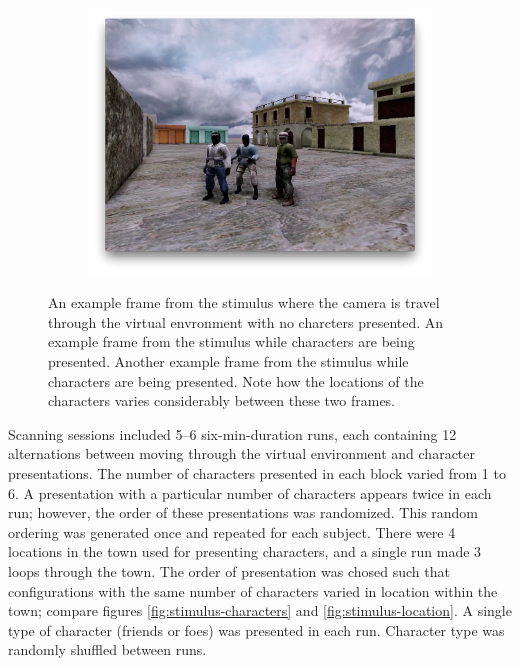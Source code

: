 \documentclass[preprint,5p,authoryear]{elsarticle}
\begin{document}
\begin{figure}
\begin{subfigure}{0.4\textwidth}
\includegraphics[width=\textwidth]{figures/stimulus-three-insurgents}
\caption{}
\label{fig:stimulus-three-insurgents}
\end{subfigure}
\caption{
 An example frame from the stimulus where the camera is travel through the virtual envronment with no charcters presented.
 An example frame from the stimulus while characters are being presented.
 Another example frame from the stimulus while characters are being presented.
Note how the locations of the characters varies considerably between these two frames.}
\label{fig:stimulus}
\end{figure}

Scanning sessions included 5--6 six-min-duration runs,
each containing 12 alternations between moving through the virtual environment and character presentations. 
The number of characters presented in each block varied from 1 to 6.
A presentation with a particular number of characters appears twice in each run; however, the order of these presentations was randomized.
This random ordering was generated once and repeated for each subject.
There were 4 locations in the town used for presenting characters, and a single run made 3 loops through the town.
The order of presentation was chosed such that configurations with the same number of characters varied in location within the town; compare figures \ref{fig:stimulus-characters} and \ref{fig:stimulus-location}.
A single type of character (friends or foes) was presented in each run. Character type was randomly shuffled between runs.
\end{document}
